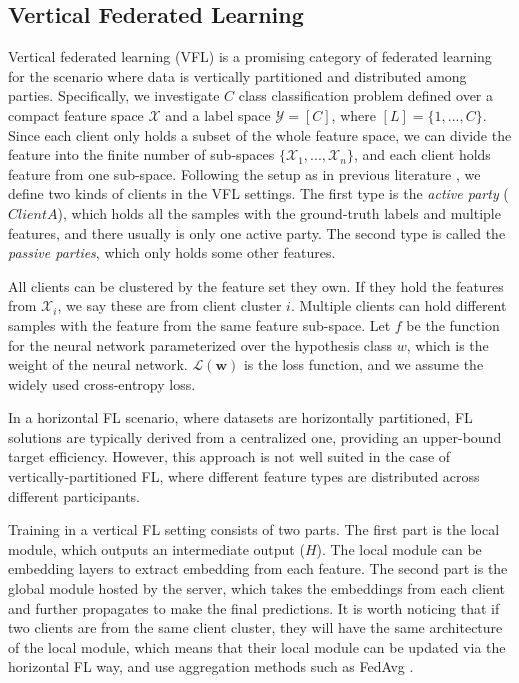 \documentclass[withindex,glossary,firstyr]{cam-thesis}
\begin{document}
\subsection{Vertical Federated Learning} \label{sec:problem_setup}
Vertical federated learning (VFL) is a promising category of federated learning for the scenario where data is vertically partitioned and distributed among parties. 
Specifically, we investigate $C$ class classification problem defined over a compact feature space $\mathcal{X}$ and a label space $\mathcal{Y} = [C]$, where $[L] = \{ 1,...,C \}$. Since each client only holds a subset of the whole feature space, we can divide the feature into the finite number of sub-spaces $\{\mathcal{X}_1,...,\mathcal{X}_n \}$, and each client holds feature from one sub-space. Following the setup as in previous literature \citep{vfl}, we define two kinds of clients in the VFL settings. The first type is the \emph{active party} ($Client A$), which holds all the samples with the ground-truth labels and multiple features, and there usually is only one active party. The second type is called the \emph{passive parties}, which only holds some other features.  

All clients can be clustered by the feature set they own. If they hold the features from $\mathcal{X}_i$, we say these are from client cluster $i$. Multiple clients can hold different samples with the feature from the same feature sub-space. 
Let $f$ be the function for the neural network parameterized over the hypothesis class $w$, which is the weight of the neural network. $\mathcal{L}(\textbf{w})$ is the loss function, and we assume the widely used cross-entropy loss.

In a horizontal FL scenario, where datasets are horizontally partitioned, FL solutions are typically derived from a centralized one, providing an upper-bound target efficiency. However, this approach is not well suited in the case of vertically-partitioned FL, where different feature types are distributed across different participants.

Training in a vertical FL setting consists of two parts. The first part is the local module, which outputs an intermediate output ($H$). The local module can be embedding layers to extract embedding from each feature. The second part is the global module hosted by the server, which takes the embeddings from each client and further propagates to make the final predictions. It is worth noticing that if two clients are from the same client cluster, they will have the same architecture of the local module, which means that their local module can be updated via the horizontal FL way, and use aggregation methods such as FedAvg \citep{fedavg}. 
\end{document}
